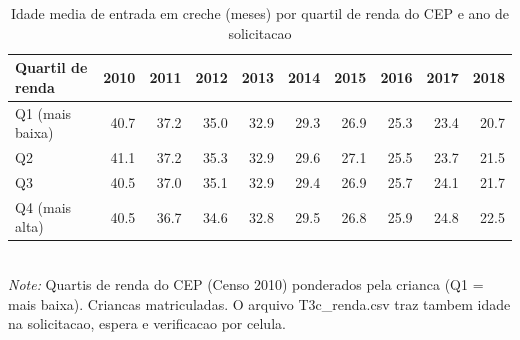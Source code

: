 \begin{table}[htbp]\centering
\caption{Idade media de entrada em creche (meses) por quartil de renda do CEP e ano de solicitacao}
\label{tab:T3c_renda}
\small
\setlength{\tabcolsep}{4pt}
\begin{tabular}{lrrrrrrrrr}
\toprule
Quartil de renda & 2010 & 2011 & 2012 & 2013 & 2014 & 2015 & 2016 & 2017 & 2018 \\
\midrule
Q1 (mais baixa) & 40.7 & 37.2 & 35.0 & 32.9 & 29.3 & 26.9 & 25.3 & 23.4 & 20.7 \\
Q2 & 41.1 & 37.2 & 35.3 & 32.9 & 29.6 & 27.1 & 25.5 & 23.7 & 21.5 \\
Q3 & 40.5 & 37.0 & 35.1 & 32.9 & 29.4 & 26.9 & 25.7 & 24.1 & 21.7 \\
Q4 (mais alta) & 40.5 & 36.7 & 34.6 & 32.8 & 29.5 & 26.8 & 25.9 & 24.8 & 22.5 \\
\bottomrule
\end{tabular}
\\[3pt]{\footnotesize \textit{Note:} Quartis de renda do CEP (Censo 2010) ponderados pela crianca (Q1 = mais baixa). Criancas matriculadas. O arquivo T3c\_renda.csv traz tambem idade na solicitacao, espera e verificacao por celula.}
\end{table}
